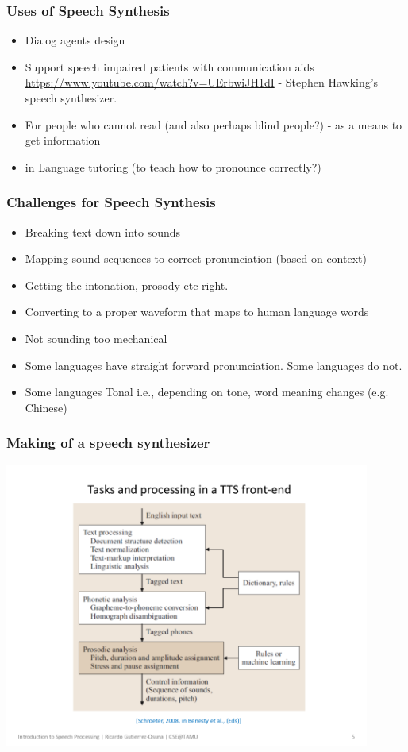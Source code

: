 \documentclass{beamer}
\begin{document}
\begin{frame}
\frametitle{Uses of Speech Synthesis}
\begin{itemize}
\item Dialog agents design
\item Support speech impaired patients with communication aids
\\ \url{https://www.youtube.com/watch?v=UErbwiJH1dI} - Stephen Hawking's speech synthesizer.
\item For people who cannot read (and also perhaps blind people?) - as a means to get information
\item in Language tutoring (to teach how to pronounce correctly?)
\end{itemize}
\end{frame}

\begin{frame}
\frametitle{Challenges for Speech Synthesis}
\begin{itemize}
\item Breaking text down into sounds
\item Mapping sound sequences to correct pronunciation (based on context)
\item Getting the intonation, prosody etc right.
\item Converting to a proper waveform that maps to human language words
\item Not sounding too mechanical
\item Some languages have straight forward pronunciation. Some languages do not. 
\item Some languages Tonal i.e., depending on tone, word meaning changes (e.g. Chinese)
\end{itemize}
\end{frame}

\begin{frame}
\frametitle{Making of a speech synthesizer}
\includegraphics[width=0.9\textwidth]{ss.png}
\end{frame}
\end{document}

